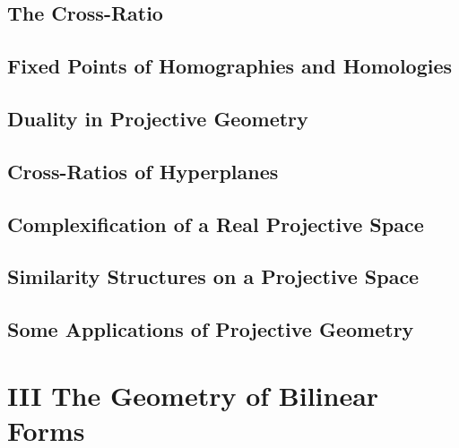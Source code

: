 \documentclass[a4paper]{article}
\begin{document}
\subsection{ The Cross-Ratio} %

\subsection{ Fixed Points of Homographies and Homologies} %

\subsection{ Duality in Projective Geometry} %

\subsection{ Cross-Ratios of Hyperplanes} %

\subsection{ Complexification of a Real Projective Space} %

\subsection{ Similarity Structures on a Projective Space} %

\subsection{ Some Applications of Projective Geometry} %


\newpage
\section*{III The Geometry of Bilinear Forms}
\end{document}
